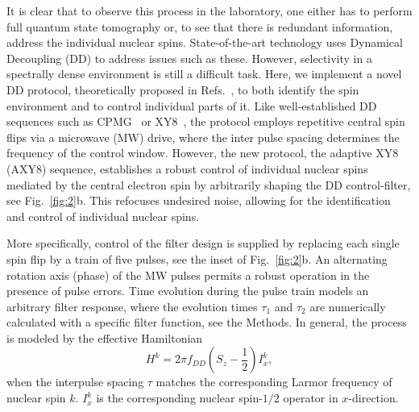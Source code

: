 \documentclass[aps,prl,floatfix,twocolumn,footinbib,superscriptaddress]{revtex4-1}
\begin{document}
It is clear that to observe this process in the laboratory, one either has to perform full quantum state tomography or, to see that there is redundant information, address the individual nuclear spins. State-of-the-art technology uses Dynamical Decoupling (DD) to address issues such as these. However, selectivity in a spectrally dense environment is still a difficult task. Here, we implement a novel DD protocol, theoretically proposed in Refs.~\cite{Cas2015,Cas17}, to both identify the spin environment and to control individual parts of it. Like well-established DD sequences such as CPMG~\cite{MAUDSLEY1986488} or XY8~\cite{gull90}, the protocol employs repetitive central spin flips via a microwave (MW) drive, where the inter pulse spacing determines the frequency of the control window. However, the new protocol, the adaptive XY8 (AXY8) sequence, establishes a robust control of individual nuclear spins mediated by the central electron spin by arbitrarily shaping the DD control-filter, see Fig.~\ref{fig:2}b. This refocuses undesired noise, allowing for the identification and control of individual nuclear spins. 

More specifically, control of the filter design is supplied by replacing each single spin flip by a train of five pulses, see the inset of Fig.~\ref{fig:2}b. An alternating rotation axis (phase) of the MW pulses permits a robust operation in the presence of pulse errors. Time evolution during the pulse train models an arbitrary filter response, where the evolution times $\tau_1$ and $\tau_2$ are numerically calculated with a specific filter function, see the Methods. In general, the process is modeled by the effective Hamiltonian~\cite{Cas2015}
\begin{equation}
H^k = 2\pi f_{DD} \left(S_z -\frac{1}{2}\right) I^k_x,
\label{eq:EM1}
\end{equation}
when the interpulse spacing $\tau$ matches the corresponding Larmor frequency of nuclear spin $k$. $I_x^k$ is the corresponding nuclear spin-$1/2$ operator in $x$-direction. 
\end{document}
